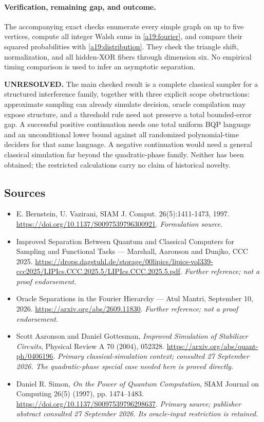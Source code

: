 \documentclass[11pt]{article}
\begin{document}
\paragraph{Verification, remaining gap, and outcome.}
The accompanying exact checks enumerate every simple graph on up to five
vertices, compute all integer Walsh sums in \eqref{a19:fourier}, and compare
their squared probabilities with \eqref{a19:distribution}. They check the
triangle shift, normalization, and all hidden-XOR fibers through dimension
six. No empirical timing comparison is used to infer an asymptotic separation.

\textbf{UNRESOLVED.} The main checked result is a complete classical sampler
for a structured interference family, together with three explicit scope
obstructions: approximate sampling can already simulate decision, oracle
compilation may expose structure, and a threshold rule need not preserve a
total bounded-error gap. A successful positive continuation needs one total
uniform BQP language and an unconditional lower bound against all randomized
polynomial-time deciders for that same language. A negative continuation
would need a general classical simulation far beyond the quadratic-phase
family. Neither has been obtained; the restricted calculations carry no
claim of historical novelty.

\subsection{Sources}
\begin{itemize}
\item[S1]E. Bernstein, U. Vazirani, SIAM J. Comput. 26(5):1411-1473, 1997.
\url{https://doi.org/10.1137/S0097539796300921}.
\textit{Formulation source.}
\item[S2]Improved Separation Between Quantum and Classical Computers for Sampling and Functional Tasks — Marshall, Aaronson and Dunjko, CCC 2025.
\url{https://drops.dagstuhl.de/storage/00lipics/lipics-vol339-ccc2025/LIPIcs.CCC.2025.5/LIPIcs.CCC.2025.5.pdf}.
\textit{Further reference; not a proof endorsement.}
\item[S3]Oracle Separations in the Fourier Hierarchy — Atul Mantri, September 10, 2026.
\url{https://arxiv.org/abs/2609.11830}.
\textit{Further reference; not a proof endorsement.}
\item[E1]Scott Aaronson and Daniel Gottesman,
\emph{Improved Simulation of Stabilizer Circuits}, Physical Review A 70
(2004), 052328.
\url{https://arxiv.org/abs/quant-ph/0406196}.
\textit{Primary classical-simulation context; consulted 27 September 2026.
The quadratic-phase special case needed here is proved directly.}
\item[E2]Daniel R. Simon, \emph{On the Power of Quantum Computation},
SIAM Journal on Computing 26(5) (1997), pp. 1474--1483.
\url{https://doi.org/10.1137/S0097539796298637}.
\textit{Primary source; publisher abstract consulted 27 September 2026.
Its oracle-input restriction is retained.}
\end{itemize}
\end{document}
